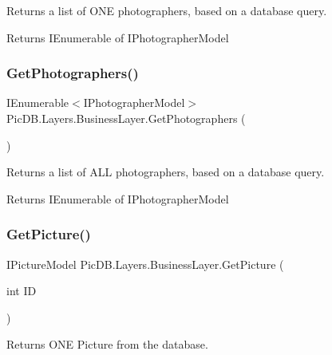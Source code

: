 Returns a list of O\+NE photographers, based on a database query. 

\begin{DoxyReturn}{Returns}
I\+Enumerable of I\+Photographer\+Model
\end{DoxyReturn}
\mbox{\label{class_pic_d_b_1_1_layers_1_1_business_layer_a68396080531045c112648c5fd7da390d}} 
\subsubsection{\texorpdfstring{Get\+Photographers()}{GetPhotographers()}}
{\footnotesize\ttfamily I\+Enumerable$<$I\+Photographer\+Model$>$ Pic\+D\+B.\+Layers.\+Business\+Layer.\+Get\+Photographers (\begin{DoxyParamCaption}{ }\end{DoxyParamCaption})}



Returns a list of A\+LL photographers, based on a database query. 

\begin{DoxyReturn}{Returns}
I\+Enumerable of I\+Photographer\+Model
\end{DoxyReturn}
\mbox{\label{class_pic_d_b_1_1_layers_1_1_business_layer_a4e8d5716c33eb4fa81b6b186ec639f21}} 
\subsubsection{\texorpdfstring{Get\+Picture()}{GetPicture()}}
{\footnotesize\ttfamily I\+Picture\+Model Pic\+D\+B.\+Layers.\+Business\+Layer.\+Get\+Picture (\begin{DoxyParamCaption}\item[{int}]{ID }\end{DoxyParamCaption})}



Returns O\+NE Picture from the database. 


